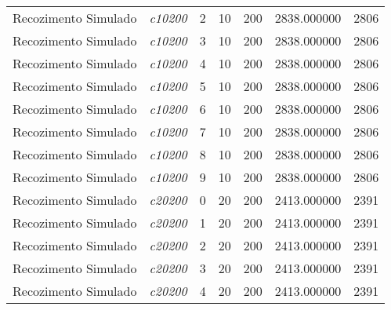 {\begin{longtable}{cc|c|cc|cc}
			Recozimento Simulado & \textit{c10200}    & 2                               & 10               & 200              & 2838.000000                          & 2806 \\ 
			Recozimento Simulado & \textit{c10200}    & 3                               & 10               & 200              & 2838.000000                          & 2806 \\ 
			Recozimento Simulado & \textit{c10200}    & 4                               & 10               & 200              & 2838.000000                          & 2806 \\ 
			Recozimento Simulado & \textit{c10200}    & 5                               & 10               & 200              & 2838.000000                          & 2806 \\ 
			Recozimento Simulado & \textit{c10200}    & 6                               & 10               & 200              & 2838.000000                          & 2806 \\ 
			Recozimento Simulado & \textit{c10200}    & 7                               & 10               & 200              & 2838.000000                          & 2806 \\ 
			Recozimento Simulado & \textit{c10200}    & 8                               & 10               & 200              & 2838.000000                          & 2806 \\ 
			Recozimento Simulado & \textit{c10200}    & 9                               & 10               & 200              & 2838.000000                          & 2806 \\ \hline
			Recozimento Simulado & \textit{c20200}    & 0                               & 20               & 200              & 2413.000000                          & 2391 \\ 
			Recozimento Simulado & \textit{c20200}    & 1                               & 20               & 200              & 2413.000000                          & 2391 \\ 
			Recozimento Simulado & \textit{c20200}    & 2                               & 20               & 200              & 2413.000000                          & 2391 \\ 
			Recozimento Simulado & \textit{c20200}    & 3                               & 20               & 200              & 2413.000000                          & 2391 \\ 
			Recozimento Simulado & \textit{c20200}    & 4                               & 20               & 200              & 2413.000000                          & 2391 \\ 

\end{longtable}}
